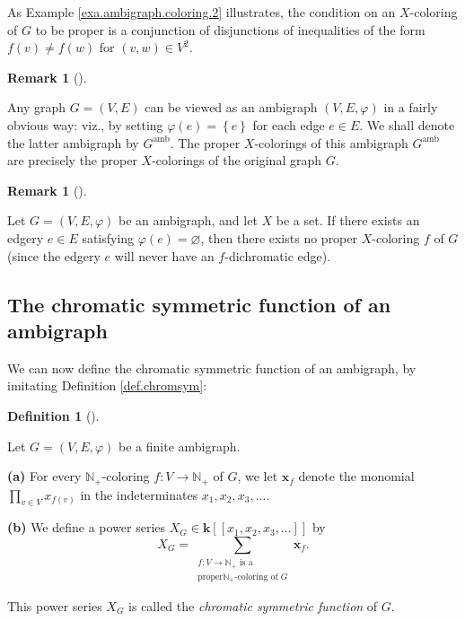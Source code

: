 \documentclass[numbers=enddot,12pt,final,onecolumn,notitlepage]{scrartcl}%
\theoremstyle{definition}
\newtheorem{defi}[theo]{Definition}
\newenvironment{definition}[1][]
{\begin{defi}[#1]\begin{leftbar}}
{\end{leftbar}\end{defi}}
\newtheorem{remk}[theo]{Remark}
\newenvironment{remark}[1][]
{\begin{remk}[#1]\begin{leftbar}}
{\end{leftbar}\end{remk}}
\let\sumnonlimits\sum
\let\prodnonlimits\prod
\renewcommand{\sum}{\sumnonlimits\limits}
\renewcommand{\prod}{\prodnonlimits\limits}
\begin{document}
As Example \ref{exa.ambigraph.coloring.2} illustrates, the condition on an
$X$-coloring of $G$ to be proper is a conjunction of disjunctions of
inequalities of the form $f\left(  v\right)  \neq f\left(  w\right)  $ for
$\left(  v,w\right)  \in V^{2}$.

\begin{remark}
\label{rmk.ambigraph.Gamb}Any graph $G=\left(  V,E\right)  $ can be viewed as
an ambigraph $\left(  V,E,\varphi\right)  $ in a fairly obvious way: viz., by
setting $\varphi\left(  e\right)  =\left\{  e\right\}  $ for each edge $e\in
E$. We shall denote the latter ambigraph by $G^{\operatorname*{amb}}$. The
proper $X$-colorings of this ambigraph $G^{\operatorname*{amb}}$ are precisely
the proper $X$-colorings of the original graph $G$.
\end{remark}

\begin{remark}
\label{rmk.ambigraph.l00p}Let $G=\left(  V,E,\varphi\right)  $ be an
ambigraph, and let $X$ be a set. If there exists an edgery $e\in E$ satisfying
$\varphi\left(  e\right)  =\varnothing$, then there exists no proper
$X$-coloring $f$ of $G$ (since the edgery $e$ will never have an
$f$-dichromatic edge).
\end{remark}

\subsection{The chromatic symmetric function of an ambigraph}

We can now define the chromatic symmetric function of an ambigraph, by
imitating Definition \ref{def.chromsym}:

\begin{definition}
\label{def.ambichromsym}Let $G=\left(  V,E,\varphi\right)  $ be a finite ambigraph.

\textbf{(a)} For every $\mathbb{N}_{+}$-coloring $f:V\rightarrow\mathbb{N}%
_{+}$ of $G$, we let $\mathbf{x}_{f}$ denote the monomial $\prod_{v\in
V}x_{f\left(  v\right)  }$ in the indeterminates $x_{1},x_{2},x_{3},\ldots$.

\textbf{(b)} We define a power series $X_{G}\in\mathbf{k}\left[  \left[
x_{1},x_{2},x_{3},\ldots\right]  \right]  $ by%
\[
X_{G}=\sum_{\substack{f:V\rightarrow\mathbb{N}_{+}\text{ is a}\\\text{proper
}\mathbb{N}_{+}\text{-coloring of }G}}\mathbf{x}_{f}.
\]


This power series $X_{G}$ is called the \emph{chromatic symmetric function} of
$G$.
\end{definition}
\end{document}
